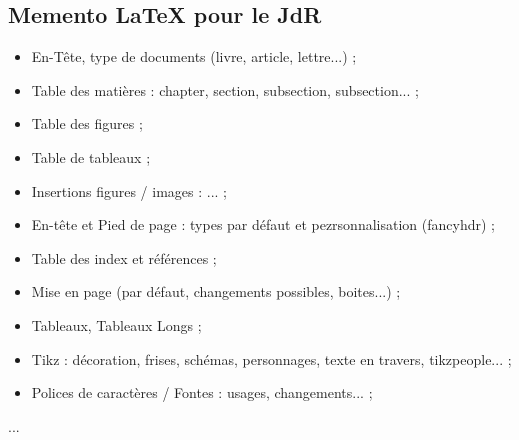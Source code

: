 \documentclass[11pt,twoside,a4paper]{article}
\begin{document}
\begin{landscape}


\begin{multicols}{2}
	\section*{Memento LaTeX pour le JdR}
	
\begin{itemize}
	\item En-Tête, type de documents (livre, article, lettre...) ; 
	\item Table des matières : chapter, section, subsection, subsection... ; 
	\item Table des figures ; 
	\item Table de tableaux ; 
	\item Insertions figures / images : ... ; 
	\item En-tête et Pied de page : types par défaut et pezrsonnalisation (fancyhdr) ; 
	\item Table des index et références ; 
	\item Mise en page (par défaut, changements possibles, boites...) ;
	\item Tableaux, Tableaux Longs ; 
	\item Tikz : décoration, frises, schémas, personnages, texte en travers, tikzpeople... ; 
	\item Polices de caractères / Fontes : usages, changements... ; 
\end{itemize}
	
	\columnbreak
	
	\vfill
	
	...
\end{multicols}

\clearpage

\end{landscape}
\end{document}
